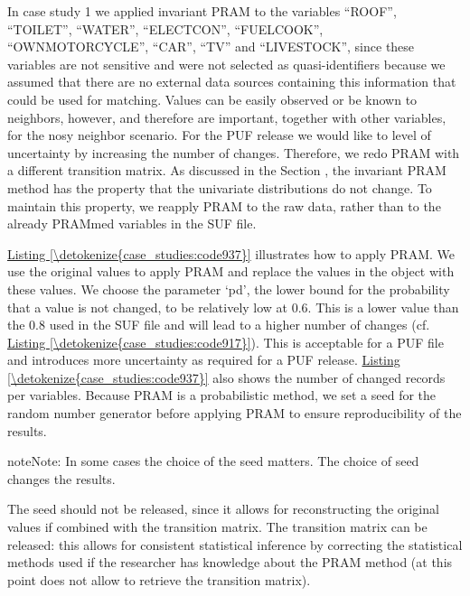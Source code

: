 \documentclass[letterpaper,10pt,english]{sphinxmanual}
\begin{document}
In case study 1 we applied invariant PRAM to the variables “ROOF”,
“TOILET”, “WATER”, “ELECTCON”, “FUELCOOK”, “OWNMOTORCYCLE”, “CAR”, “TV”
and “LIVESTOCK”, since these variables are not sensitive and were not
selected as quasi-identifiers because we assumed that there are no
external data sources containing this information that could be used for
matching. Values can be easily observed or be known to neighbors,
however, and therefore are important, together with other variables, for
the nosy neighbor scenario. For the PUF release we would like to level
of uncertainty by increasing the number of changes. Therefore, we redo
PRAM with a different transition matrix. As discussed in the Section
,
the invariant PRAM method has the property that the univariate
distributions do not change. To maintain this property, we reapply PRAM
to the raw data, rather than to the already PRAMmed variables in the SUF
file.

\hyperref[\detokenize{case_studies:code937}]{Listing \ref{\detokenize{case_studies:code937}}} illustrates how to apply PRAM. We use the original values
to apply PRAM and replace the values in the  object with these
values. We choose the parameter ‘pd’, the lower bound for the
probability that a value is not changed, to be relatively low at 0.6.
This is a lower value than the 0.8 used in the SUF file and will lead to
a higher number of changes (cf. \hyperref[\detokenize{case_studies:code917}]{Listing \ref{\detokenize{case_studies:code917}}}). This is
acceptable for a PUF file and introduces more uncertainty as required
for a PUF release. \hyperref[\detokenize{case_studies:code937}]{Listing \ref{\detokenize{case_studies:code937}}} also shows the number of changed records
per variables. Because PRAM is a probabilistic method, we set a seed for
the random number generator before applying PRAM to ensure
reproducibility of the results.

\begin{sphinxadmonition}{note}{Note:}
In some cases the choice of the seed matters. The choice of seed changes the results.
\end{sphinxadmonition}

The seed should not be released, since it allows for reconstructing the original values
if combined with the transition matrix. The transition matrix can be
released: this allows for consistent statistical inference by correcting
the statistical methods used if the researcher has knowledge about the
PRAM method (at this point  does not allow to retrieve the
transition matrix).
\end{document}

